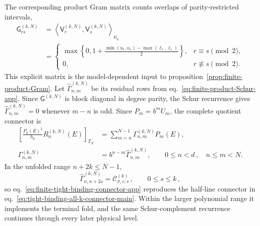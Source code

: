\documentclass[a4paper,11pt]{article}
\theoremstyle{definition}
\theoremstyle{remark}
\begin{document}
The corresponding product Gram matrix counts overlaps of
parity-restricted intervals,
\begin{equation}
\begin{aligned}
   \mathsf G_{rs}^{(k,N)}
   &=
   \left\langle
      \mathsf V_r^{(k,N)},\mathsf V_s^{(k,N)}
   \right\rangle_{\mu_0}\\
   &=
   \begin{cases}
      \displaystyle
      \max\left\{0,
      1+\frac{\min(u_r,u_s)-\max(\ell_r,\ell_s)}{2}
      \right\},
      &r\equiv s\pmod 2,\\[9pt]
      0,&r\not\equiv s\pmod 2.
   \end{cases}
\end{aligned}
   \label{eq:tight-binding-fusion-Gram-app}
\end{equation}
This explicit matrix is the model-dependent input to
proposition~\ref{prop:finite-product-Gram}.  Let
$\widehat\Gamma_{n,m}^{(k,N)}$ be its residual rows from
eq.~\eqref{eq:finite-product-Schur-app}.  Since
$\mathsf G^{(k,N)}$ is block diagonal in degree parity, the Schur
recurrence gives
$\widehat\Gamma_{n,m}^{(k,N)}=0$ whenever $m-n$ is odd.  Since
$P_m=b^mU_m$, the complete quotient connector is
\begin{equation}
\begin{aligned}
   \left[
      \frac{P_k(E)^2}{h_k}R_n^{(k,N)}(E)
   \right]_{T_N}
   &=
   \sum_{m=n}^{N-1}
   \Gamma_{n,m}^{(k,N)}P_m(E),\\
   \Gamma_{n,m}^{(k,N)}
   &=b^{n-m}\widehat\Gamma_{n,m}^{(k,N)},
   \qquad
   0\le n<d\,,\quad n\le m<N.
\end{aligned}
   \label{eq:finite-tight-binding-connector-app}
\end{equation}
In the unfolded range $n+2k\le N-1$,
\begin{equation}
   \widehat\Gamma_{n,n+2s}^{(k,N)}
   =\mathcal C_{\sigma,\varepsilon;s}^{(k)}\,,
   \qquad 0\le s\le k\,,
\end{equation}
so eq.~\eqref{eq:finite-tight-binding-connector-app} reproduces the
half-line connector in
eq.~\eqref{eq:tight-binding-all-k-connector-main}.  Within the larger
polynomial range it implements the terminal fold, and the same
Schur-complement recurrence continues through every later physical
level.
\end{document}
